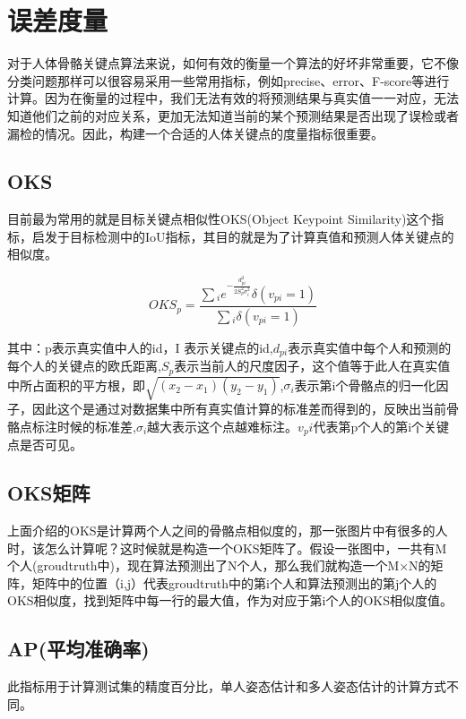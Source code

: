 \section{误差度量}

对于人体骨骼关键点算法来说，如何有效的衡量一个算法的好坏非常重要，它不像分类问题那样可以很容易采用一些常用指标，例如precise、error、F-score等进行计算。因为在衡量的过程中，我们无法有效的将预测结果与真实值一一对应，无法知道他们之前的对应关系，更加无法知道当前的某个预测结果是否出现了误检或者漏检的情况。因此，构建一个合适的人体关键点的度量指标很重要。

\subsection{OKS}

目前最为常用的就是目标关键点相似性OKS(Object Keypoint Similarity)这个指标，启发于目标检测中的IoU指标，其目的就是为了计算真值和预测人体关键点的相似度。

\begin{equation}
OK{S_p} = \frac{{\sum {_i{e^{ - \frac{{d_{pi}^2}}{{2S_p^2\sigma _i^2}}}}\delta \left( {{v_{pi}} = 1} \right)} }}{{\sum {_i\delta \left( {{v_{pi}} = 1} \right)} }}
\end{equation}

其中：p表示真实值中人的id，I 表示关键点的id,$d_{pi}$表示真实值中每个人和预测的每个人的关键点的欧氏距离,$S_p$表示当前人的尺度因子，这个值等于此人在真实值中所占面积的平方根，即$\sqrt {\left( {{x_2} - {x_1}} \right)\left( {{y_2} - {y_1}} \right)}$,${\sigma _i}$表示第i个骨骼点的归一化因子，因此这个是通过对数据集中所有真实值计算的标准差而得到的，反映出当前骨骼点标注时候的标准差,${\sigma _i}$越大表示这个点越难标注。$v_pi$代表第p个人的第i个关键点是否可见。

\subsection{OKS矩阵}

上面介绍的OKS是计算两个人之间的骨骼点相似度的，那一张图片中有很多的人时，该怎么计算呢？这时候就是构造一个OKS矩阵了。假设一张图中，一共有M个人(groudtruth中)，现在算法预测出了N个人，那么我们就构造一个M×N的矩阵，矩阵中的位置（i,j）代表groudtruth中的第i个人和算法预测出的第j个人的OKS相似度，找到矩阵中每一行的最大值，作为对应于第i个人的OKS相似度值。

\subsection{AP(平均准确率)}
此指标用于计算测试集的精度百分比，单人姿态估计和多人姿态估计的计算方式不同。

